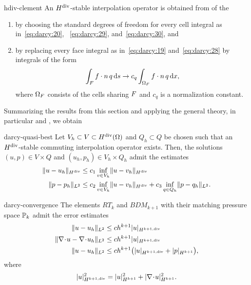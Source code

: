 \begin{Definition}{hdiv-clement}
  An $\Hdiv$-stable interpolation operator is obtained from
   of the
  \begin{enumerate}
  \item by choosing the standard degrees of freedom for every cell
    integral as in~\eqref{eq:darcy:20}, ~\eqref{eq:darcy:29},
    and~\eqref{eq:darcy:30}, and
  \item by replacing every face integral as in~\eqref{eq:darcy:19}
    and~\eqref{eq:darcy:28} by integrals of the form
    \begin{gather}
      \int_{\face} f\cdot\n \,q \ds
      \to
      c_q \int_{\domain_\face} f\cdot \n \,q \dx,
    \end{gather}
    where $\domain_\face$ consists of the cells sharing $\face$ and
    $c_q$ is a normalization constant.
  \end{enumerate}
\end{Definition}

Summarizing the results from this section and applying the general
theory, in particular  and
, we obtain

\begin{Theorem}{darcy-quasi-best}
  Let $V_h\subset V\subset \Hdiv(\domain)$ and $Q_h\subset Q$ be
  chosen such that an $\Hdiv$-stable commuting interpolation operator
  exists. Then, the solutions $(u,p) \in V\times Q$ and
  $(u_h,p_h) \in V_h\times Q_h$ admit the 
  estimates
  \begin{align}
    \norm{u-u_h}_{\Hdiv} & \le c_1 \inf_{v\in V_h} \norm{u-v_h}_{\Hdiv} \\
    \norm{p-p_h}_{L^2} & \le c_2 \inf_{v\in V_h} \norm{u-v_h}_{\Hdiv}
                         + c_3 \inf_{q\in Q_h} \norm{p-q_h}_{L^2}.
  \end{align}
\end{Theorem}

\begin{Corollary}{darcy-convergence}
  The elements $RT_k$ and $BDM_{k+1}$ with their matching pressure
  space $\P_k$ admit the error estimates
  \begin{align}
    \norm{u-u_h}_{L^2} &\le c h^{k+1} \snorm{u}_{H^{k+1,\text{div}}} \\
    \norm{\div u-\div u_h}_{L^2} &\le c h^{k+1} \snorm{u}_{H^{k+1,\text{div}}} \\
    \norm{u-u_h}_{L^2} &\le c h^{k+1}
                         \bigl(\snorm{u}_{H^{k+1,\text{div}}}
    + \snorm{p}_{H^{k+1}} \bigr),
  \end{align}
  where
  \begin{gather}
    \snorm{u}_{H^{k+1,\text{div}}}^2 = \snorm{u}_{H^{k+1}}^2
    + \snorm{\div u}_{H^{k+1}}^2.
  \end{gather}
\end{Corollary}

